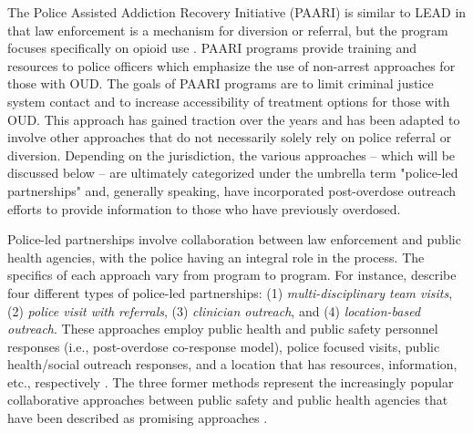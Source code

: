 The Police Assisted Addiction Recovery Initiative (PAARI) is similar to LEAD in that law enforcement is a mechanism for diversion or referral, but the program focuses specifically on opioid use \parencite{goodison_law_2019}. PAARI programs provide training and resources to police officers which emphasize the use of non-arrest approaches for those with OUD. The goals of PAARI programs are to limit criminal justice system contact and to increase accessibility of treatment options for those with OUD. This approach has gained traction over the years and has been adapted to involve other approaches that do not necessarily solely rely on police referral or diversion. Depending on the jurisdiction, the various approaches -- which will be discussed below -- are ultimately categorized under the umbrella term "police-led partnerships" and, generally speaking, have incorporated post-overdose outreach efforts to provide information to those who have previously overdosed.

Police-led partnerships involve collaboration between law enforcement and public health agencies, with the police having an integral role in the process. The specifics of each approach vary from program to program. For instance, \textcite{formica_post_2018} describe four different types of police-led partnerships: (1) \textit{multi-disciplinary team visits}, (2) \textit{police visit with referrals}, (3) \textit{clinician outreach}, and (4) \textit{location-based outreach}. These approaches employ public health and public safety personnel responses (i.e., post-overdose co-response model), police focused visits, public health/social outreach responses, and a location that has resources, information, etc., respectively \parencite{formica_post_2018}. The three former methods represent the increasingly popular collaborative approaches between public safety and public health agencies that have been described as promising approaches \parencite{yatsco_developing_2020}. 

